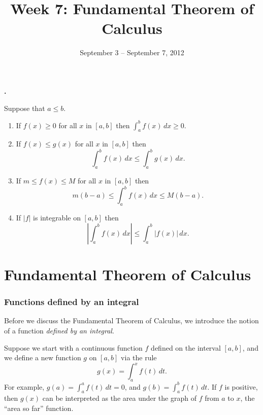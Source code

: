 \documentclass[t]{beamer}
\title{Week 7:  Fundamental Theorem of Calculus}
\date{September 3 -- September 7, 2012}
\theoremstyle{plain}
\theoremstyle{definition}
\newcommand{\ds}{\displaystyle}
\newcounter{heading}
\newcommand{\newhead}[1]{\medskip\stepcounter{heading}\noindent\textbf{\hspace{0.2cm}{#1}.}}
\begin{document}
\frame{\titlepage}

\setcounter{tocdepth}{2}


\begin{frame}
\newhead{Comparison properties of the integral}

\noindent Suppose that $a \leq b$.

\begin{enumerate}[<+->]
\item If $f(x)\geq0$ for all $x$ in $[a,b]$ then $\ds \int_a^b f(x)\,dx\geq0$.

\vspace*{.3cm}

\item If $f(x)\leq g(x)$ for all $x$ in $[a,b]$ then
\[\ds \int_a^b f(x)\,dx\leq\int_a^b g(x)\,dx.\]

\vspace*{.3cm}

\item If $m\leq f(x)\leq M$ for all $x$ in $[a,b]$ then
\[m(b-a)\leq \int_a^b f(x)\,dx \leq M(b-a).\]


\vspace*{.3cm}

\item If $|f|$ is integrable on $[a,b]$ then
\[\left|\int_a^bf(x)\,dx\right|\leq\int_a^b|f(x)|\,dx.\]
\end{enumerate}
\end{frame}

\section{Fundamental Theorem of Calculus}
\begin{frame}
\frametitle{Functions defined by an integral}

\noindent Before we discuss the Fundamental Theorem of Calculus, we introduce the notion of a function \emph{defined by an integral}.\pause  

\noindent Suppose we start with a continuous function $f$ defined on the interval $[a,b]$, and we define a new function $g$ on $[a,b]$ via the rule
\[ g(x) = \int_{a}^{x}f(t)\,dt.\]\pause 
For example, $g(a) = \int_{a}^{a} f(t)\,dt = 0$, and $g(b) = \int_{a}^{b}f(t)\,dt$.  If $f$ is positive, then $g(x)$ can be interpreted as the area under the graph of $f$ from $a$ to $x$, the ``area so far'' function.
\end{frame}
\end{document}
